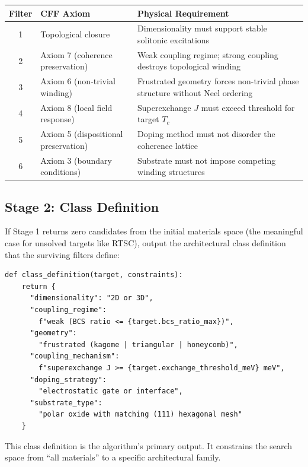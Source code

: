 \documentclass[11pt, a4paper]{article}
\begin{document}
\begin{center}
\begin{tabular}{@{}clp{7cm}@{}}
\toprule
\textbf{Filter} & \textbf{CFF Axiom} & \textbf{Physical Requirement} \\
\midrule
1 & Topological closure & Dimensionality must support stable
    solitonic excitations \\
2 & Axiom 7 (coherence preservation) & Weak coupling regime;
    strong coupling destroys topological winding \\
3 & Axiom 6 (non-trivial winding) & Frustrated geometry forces
    non-trivial phase structure without Neel ordering \\
4 & Axiom 8 (local field response) & Superexchange $J$ must
    exceed threshold for target $T_c$ \\
5 & Axiom 5 (dispositional preservation) & Doping method must
    not disorder the coherence lattice \\
6 & Axiom 3 (boundary conditions) & Substrate must not impose
    competing winding structures \\
\bottomrule
\end{tabular}
\end{center}

\subsection{Stage 2: Class Definition}

If Stage 1 returns zero candidates from the initial materials
space (the meaningful case for unsolved targets like RTSC), output
the architectural class definition that the surviving filters
define:

\begin{lstlisting}
def class_definition(target, constraints):
    return {
      "dimensionality": "2D or 3D",
      "coupling_regime":
        f"weak (BCS ratio <= {target.bcs_ratio_max})",
      "geometry":
        "frustrated (kagome | triangular | honeycomb)",
      "coupling_mechanism":
        f"superexchange J >= {target.exchange_threshold_meV} meV",
      "doping_strategy":
        "electrostatic gate or interface",
      "substrate_type":
        "polar oxide with matching (111) hexagonal mesh"
    }
\end{lstlisting}

This class definition is the algorithm's primary output. It
constrains the search space from ``all materials'' to a specific
architectural family.
\end{document}
